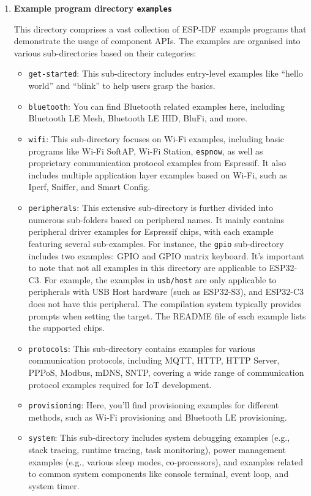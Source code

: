 \documentclass[a4paper,12pt,openany]{book}
\begin{document}
\begin{enumerate}[label=(\arabic*),leftmargin=2em]
\begin{enumerate}[label=\textbf{\alph*.},leftmargin=0em]
        \item \textbf{Example program directory \texttt{examples}}

        This directory comprises a vast collection of ESP-IDF example programs that demonstrate the usage of component APIs. The examples are organised into various sub-directories based on their categories:

        \begin{itemize}[leftmargin=1em]
            \item \verb|get-started|: This sub-directory includes entry-level examples like “hello world” and “blink” to help users grasp the basics.
            \item \verb|bluetooth|: You can find Bluetooth related examples here, including Bluetooth LE Mesh, Bluetooth LE HID, BluFi, and more.
            \item \verb|wifi|: This sub-directory focuses on Wi-Fi examples, including basic programs like Wi-Fi SoftAP, Wi-Fi Station, \verb|espnow|, as well as proprietary communication protocol examples from Espressif. It also includes multiple application layer examples based on Wi-Fi, such as Iperf, Sniffer, and Smart Config.
            \item \verb|peripherals|: This extensive sub-directory is further divided into numerous sub-folders based on peripheral names. It mainly contains peripheral driver examples for Espressif chips, with each example featuring several sub-examples. For instance, the \verb|gpio| sub-directory includes two examples: GPIO and GPIO matrix keyboard. It’s important to note that not all examples in this directory are applicable to ESP32-C3.  For example, the examples in \verb|usb/host| are only applicable to peripherals with USB Host hardware (such as ESP32-S3), and ESP32-C3 does not have this peripheral. The compilation system typically provides prompts when setting the target. The README file of each example lists the supported chips.
            \item \verb|protocols|: This sub-directory contains examples for various communication protocols, including MQTT, HTTP, HTTP Server, PPPoS, Modbus, mDNS, SNTP, covering a wide range of communication protocol examples required for IoT development.
            \item \verb|provisioning|: Here, you’ll find provisioning examples for different methods, such as Wi-Fi provisioning and Bluetooth LE provisioning.
            \item \verb|system|: This sub-directory includes system debugging examples (e.g., stack tracing, runtime tracing, task monitoring), power management examples (e.g., various sleep modes, co-processors), and examples related to common system components like console terminal, event loop, and system timer.

\end{itemize}
\end{enumerate}
\end{enumerate}
\end{document}
